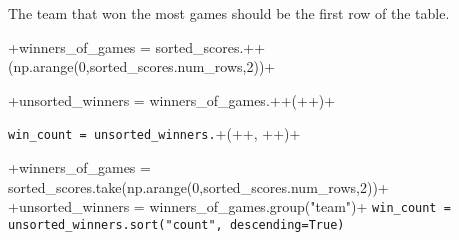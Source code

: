 \begin{enumerate}
The team that won the most games should be the first row of the table.\newline
\vskip 0.1in
\solutionimage 
{
\lsi+winners_of_games = sorted_scores.+\bkshort+(np.arange(0,sorted_scores.num_rows,2))+\newline

\lsi+unsorted_winners = winners_of_games.+\bk+(+\bk+)+\newline

\lstinline+win_count = unsorted_winners.+\bk+(+\bk+, +\bk+)+
}
{
{\lsi+winners_of_games = sorted_scores.take(np.arange(0,sorted_scores.num_rows,2))+}\newline
{\lsi+unsorted_winners = winners_of_games.group("team")+}\newline
{\lstinline+win_count = unsorted_winners.sort("count", descending=True)+}

}


\end{enumerate}